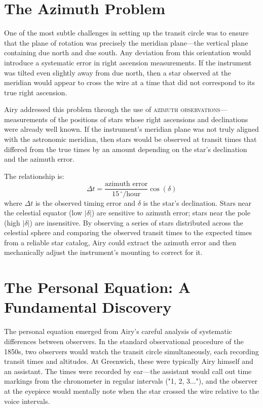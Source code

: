\section{The Azimuth Problem}

One of the most subtle challenges in setting up the transit circle was to ensure that the plane of rotation was precisely the meridian plane—the vertical plane containing due north and due south. Any deviation from this orientation would introduce a systematic error in right ascension measurements. If the instrument was tilted even slightly away from due north, then a star observed at the meridian would appear to cross the wire at a time that did not correspond to its true right ascension.

Airy addressed this problem through the use of \textsc{azimuth observations}—measurements of the positions of stars whose right ascensions and declinations were already well known. If the instrument's meridian plane was not truly aligned with the astronomic meridian, then stars would be observed at transit times that differed from the true times by an amount depending on the star's declination and the azimuth error.

The relationship is:
\[
  \Delta t = \frac{\text{azimuth error}}{15\,^\circ/\text{hour}} \cos(\delta)
\]
where $\Delta t$ is the observed timing error and $\delta$ is the star's declination. Stars near the celestial equator (low $|\delta|$) are sensitive to azimuth error; stars near the pole (high $|\delta|$) are insensitive. By observing a series of stars distributed across the celestial sphere and comparing the observed transit times to the expected times from a reliable star catalog, Airy could extract the azimuth error and then mechanically adjust the instrument's mounting to correct for it.

\section{The Personal Equation: A Fundamental Discovery}

The personal equation emerged from Airy's careful analysis of systematic differences between observers. In the standard observational procedure of the 1850s, two observers would watch the transit circle simultaneously, each recording transit times and altitudes. At Greenwich, these were typically Airy himself and an assistant. The times were recorded by ear—the assistant would call out time markings from the chronometer in regular intervals ("1, 2, 3..."), and the observer at the eyepiece would mentally note when the star crossed the wire relative to the voice intervals.

